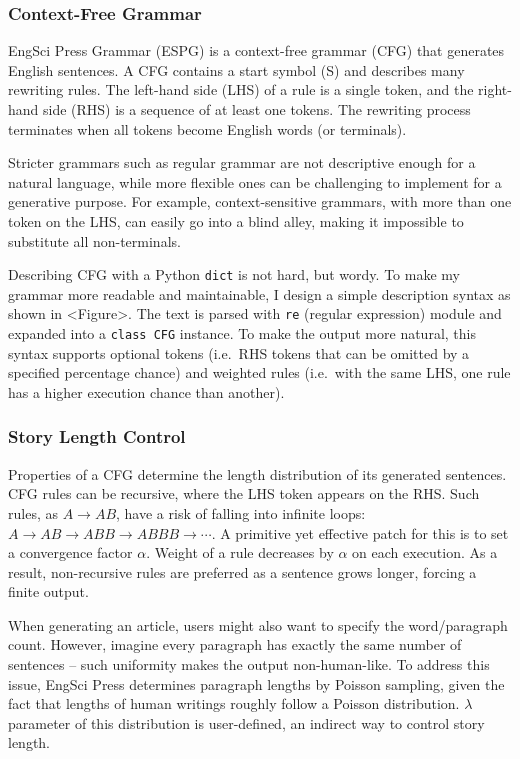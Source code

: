 \documentclass[../main.tex]{subfiles}
\begin{document}
\subsubsection{Context-Free Grammar}

EngSci Press Grammar (ESPG) is a context-free grammar (CFG) that generates English sentences. A CFG contains a start symbol (S) and describes many rewriting rules. The left-hand side (LHS) of a rule is a single token, and the right-hand side (RHS) is a sequence of at least one tokens. The rewriting process terminates when all tokens become English words (or terminals).

Stricter grammars such as regular grammar are not descriptive enough for a natural language, while more flexible ones can be challenging to implement for a generative purpose. For example, context-sensitive grammars, with more than one token on the LHS, can easily go into a blind alley, making it impossible to substitute all non-terminals.

Describing CFG with a Python \texttt{dict} is not hard, but wordy. To make my grammar more readable and maintainable, I design a simple description syntax as shown in <Figure>. The text is parsed with \texttt{re} (regular expression) module and expanded into a \texttt{class CFG} instance. To make the output more natural, this syntax supports optional tokens (i.e.\ RHS tokens that can be omitted by a specified percentage chance) and weighted rules (i.e.\ with the same LHS, one rule has a higher execution chance than another).

\subsubsection{Story Length Control}

Properties of a CFG determine the length distribution of its generated sentences. CFG rules can be recursive, where the LHS token appears on the RHS. Such rules, as $A \rightarrow A B$, have a risk of falling into infinite loops: $A \rightarrow A B \rightarrow A B B \rightarrow A B B B \rightarrow \cdots$. A primitive yet effective patch for this is to set a convergence factor $\alpha$. Weight of a rule decreases by $\alpha$ on each execution. As a result, non-recursive rules are preferred as a sentence grows longer, forcing a finite output.

When generating an article, users might also want to specify the word/paragraph count. However, imagine every paragraph has exactly the same number of sentences -- such uniformity makes the output non-human-like. To address this issue, EngSci Press determines paragraph lengths by Poisson sampling, given the fact that lengths of human writings roughly follow a Poisson distribution. $\lambda$ parameter of this distribution is user-defined, an indirect way to control story length.
\end{document}
